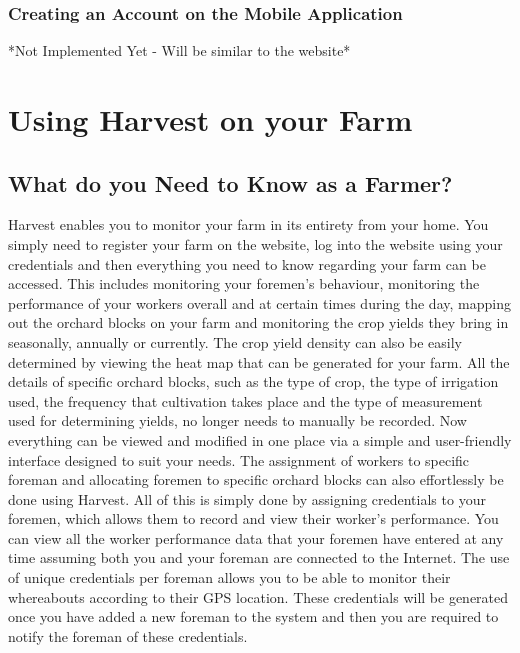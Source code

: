 \documentclass[11pt,fleqn]{book} %
\begin{document}
		\subsection{Creating an Account on the Mobile Application}
			*Not Implemented Yet - Will be similar to the website*


\chapter{Using Harvest on your Farm}
	\section{What do you Need to Know as a Farmer?}
		
		Harvest enables you to monitor your farm in its entirety from your home. You simply need to register your farm on the website, log into the website using your credentials and then everything you need to know regarding your farm can be accessed. This includes monitoring your foremen's behaviour, monitoring the performance of your workers overall and at certain times during the day, mapping out the orchard blocks on your farm and monitoring the crop yields they bring in seasonally, annually or currently. The crop yield density can also be easily determined by viewing the heat map that can be generated for your farm. All the details of specific orchard blocks, such as the type of crop, the type of irrigation used, the frequency that cultivation takes place and the type of measurement used for determining yields, no longer needs to manually be recorded. Now everything can be viewed and modified in one place via a simple and user-friendly interface designed to suit your needs. The assignment of workers to specific foreman and allocating foremen to specific orchard blocks can also effortlessly be done using Harvest. All of this is simply done by assigning credentials to your foremen, which allows them to record and view their worker's performance. You can view all the worker performance data that your foremen have entered at any time assuming both you and your foreman are connected to the Internet. The use of unique credentials per foreman allows you to be able to monitor their whereabouts according to their GPS location. These credentials will be generated once you have added a new foreman to the system and then you are required to notify the foreman of these credentials.\newline\newline
		
\end{document}
